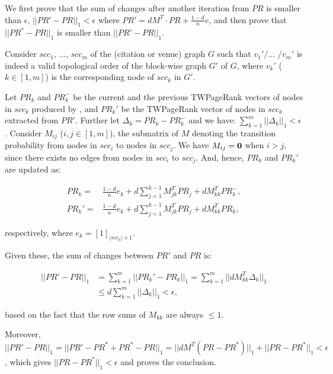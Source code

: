 \begin{proofS}
We first prove that the sum of changes after another iteration from $PR$ is smaller than $\epsilon$, \ie $||PR'-PR||_1 < \epsilon$ where $PR'=d M^T\cdot PR + \frac{1-d}{n} e$, and then prove that $||PR^*-PR||_1$ is smaller than $||PR'-PR||_1$.

Consider $scc_1$, $\dots$, $scc_m$ of the (citation or venue) graph $G$ such that $v_1'/\dots$ $/v_m'$ is indeed a valid topological order of the block-wise graph $G'$ of $G$, where %
$v_k'$ ($k\in [1,m]$) is the corresponding node of $scc_k$ in $G'$.

Let $PR_k$ and $PR_k^-$ be the current and the previous TWPageRank vectors of nodes in $scc_k$ produced
by \twprscc, and $PR_k'$ be the TWPageRank vector of nodes in $scc_k$ extracted from $PR'$.
Further let $\Delta_k=PR_k-PR^-_k$ and we have:
$\sum_{k=1}^m ||\Delta_k||_1 < \epsilon$.
%
Consider $M_{ij}$ ($i,j\in[1,m]$), the submatrix of $M$ denoting the transition probability from nodes in $scc_i$ to nodes in $scc_j$. We have $M_{ij}=\bf{0}$ when $i>j$, since there exists no edges from nodes in $scc_i$ to $scc_j$. And, hence, $PR_k$ and $PR_k'$ are updated as:

\vspace{-3ex}
\begin{small}
\begin{equation*}
\begin{split}
PR_k=&\frac{1-d}{n} e_k+ d \sum_{j=1}^{k-1} M_{jk}^T PR_j + d M_{kk}^T PR_k^-,\\
PR_k'=&\frac{1-d}{n}  e_k+ d \sum_{j=1}^{k-1} M_{jk}^T PR_j + d M_{kk}^T PR_k,
\end{split}
\end{equation*}
\end{small}
\noindent
respectively, where $e_k=[1]_{|scc_k|\times 1}$.

\vspace{0ex}
Given these, the sum of changes between $PR'$ and $PR$ is:
%
\begin{small}
\begin{equation*}
\begin{split}
||PR'-PR||_1 & =\sum_{k=1}^m ||PR_k'-PR_k||_1 = \sum_{k=1}^m ||d M_{kk}^T \Delta_k||_1 \\
& \le d\sum_{k=1}^m ||\Delta_k||_1 < \epsilon,
\end{split}
\end{equation*}
\end{small}
\noindent
based on the fact that the row sums of $M_{kk}$ are always $\le 1$. %

Moreover, $||PR'-PR||_1 = ||PR' - PR^* + PR^* -PR||_1 = ||d M^T (PR-PR^*)||_1 + ||PR-PR^*||_1<\epsilon$, which gives $||PR-PR^*||_1<\epsilon$ and proves the conclusion.
\end{proofS}

